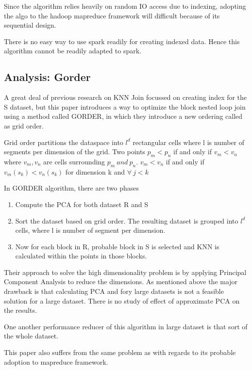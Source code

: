 \documentclass[conference]{IEEEtran}
\begin{document}
Since the algorithm relies heavily on random IO access due to
indexing, adopting the algo to the hadoop mapreduce framework will
difficult because of its sequential design.

There is no easy way to use spark readily for creating indexed
data. Hence this algorithm cannot be readily adapted to spark.

\bigskip

\subsection{Analysis: Gorder}
A great deal of previous research on KNN Join focussed on creating
index for the S dataset, but this paper \cite{xia_gorder:_2004} introduces a
way to optimize the block nested loop join using a method called
GORDER, in which they introduce a new ordering called as grid order.

Grid order partitions the dataspace into $l^d$ rectangular cells where
l is number of segments per dimension of the grid. Two points $p_m <
p_n $ if and only if $v_m < v_n$ where $v_m, v_n$ are cells
surrounding $p_m\ and\ p_n$. $v_m < v_n$ if and only if $v_m(s_k) <
v_n(s_k)$ for dimension k and $\forall\ j < k$
\bigskip

In GORDER algorithm, there are two phases
\begin{enumerate}
\item Compute the PCA for both dataset R and S
\item Sort the dataset based on grid order. The resulting dataset is
  grouped into $l^d$ cells, where l is number of segment per
  dimension.
\item Now for each block in R, probable block in S is selected and KNN
  is calculated within the points in those blocks.
\end{enumerate}

\bigskip

Their approach to solve the high dimensionality problem is
by applying Principal Component Analysis to reduce the dimensions. As
mentioned above the major drawback is that calculating PCA and fory
large datasets is not a feasible solution for a large dataset. There
is no study of effect of approximate PCA on the results.

One another performance reducer of this algorithm in large dataset is that sort
of the whole dataset.

This paper also suffers from the same problem as
\cite{yu_efficient_2007} with regards to its probable adoption to
mapreduce framework.
\end{document}
